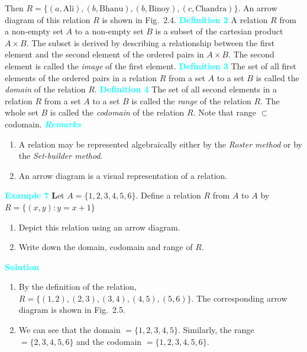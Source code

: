 \documentclass[11pt]{article}
\begin{document}
Then $R = \{(a, \text{Ali}), (b, \text{Bhanu}), (b, \text{Binoy}), (c, \text{Chandra})\}$.
An arrow diagram of this relation $R$ is shown in Fig.~2.4.
\vspace{0.8em}
\vspace{0.8em}
\noindent
\colorbox{ncertblue}{\textcolor{cyan}{\textbf{Definition 2}}}\hspace{0.5em}
A relation $R$ from a non-empty set $A$ to a non-empty set $B$ is a subset of
the cartesian product $A \times B$. The subset is derived by describing a
relationship between the first element and the second element of the ordered
pairs in $A \times B$. The second element is called the \textit{image} of the
first element.
\vspace{0.6em}
\noindent
\colorbox{ncertblue}{\textcolor{cyan}{\textbf{Definition 3}}}\hspace{0.5em}
The set of all first elements of the ordered pairs in a relation $R$ from a set
$A$ to a set $B$ is called the \textit{domain} of the relation $R$.
\vspace{0.6em}
\noindent
\colorbox{ncertblue}{\textcolor{cyan}{\textbf{Definition 4}}}\hspace{0.5em}
The set of all second elements in a relation $R$ from a set $A$ to a set $B$ is
called the \textit{range} of the relation $R$. The whole set $B$ is called the
\textit{codomain} of the relation $R$. Note that range $\subset$ codomain.
\vspace{0.6em}
\noindent
\colorbox{ncertblue}{\textcolor{cyan}{\textbf{\textit{Remarks}}}}
\begin{enumerate}
\item A relation may be represented algebraically either by the
\textit{Roster method} or by the \textit{Set-builder method}.
\item An arrow diagram is a visual representation of a relation.
\end{enumerate}
\noindent\textcolor{cyan}{\textbf{Example 7}}
\textbf Let $A=\{1,2,3,4,5,6\}$. Define a relation $R$ from $A$ to $A$ by 
$R=\{(x,y):y=x+1\}$
\begin{enumerate}
    \item[(i)] Depict this relation using an arrow diagram.
    \item[(ii)] Write down the domain, codomain and range of $R$.
\end{enumerate}
\noindent\textcolor{cyan}{\textbf{Solution}}
\noindent
\begin{minipage}[t]{0.58\textwidth}
\begin{enumerate}[label=(\roman*), leftmargin=1.5em, nosep]
\item By the definition of the relation,
$R=\{(1,2),(2,3),(3,4),(4,5),(5,6)\}.$
The corresponding arrow diagram is shown in Fig.~2.5.
\item We can see that the domain $=\{1,2,3,4,5\}$.  
Similarly, the range $=\{2,3,4,5,6\}$ and the codomain
$=\{1,2,3,4,5,6\}$.
\end{enumerate}
\end{minipage}
\end{document}
